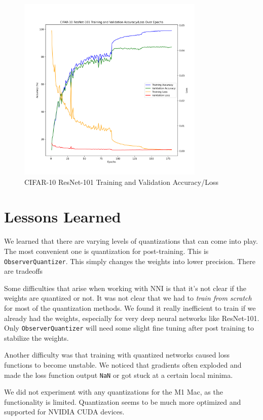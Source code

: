 \documentclass{article}
\begin{document}
\begin{figure}
    \centerline{\includegraphics[width=3.5in]{../proj2/figures/cifar10_baseline.png}}
    \caption{CIFAR-10 ResNet-101 Training and Validation Accuracy/Loss}
    \label{fig:cifar-resnet-nq}
\end{figure}

\section{Lessons Learned}
We learned that there are varying levels of quantizations that can come into play. The most convenient one is quantization for post-training. This is \verb|ObserverQuantizer|. This simply changes the weights into lower precision. There are tradeoffs


Some difficulties that arise when working with NNI is that it's not clear if the weights are quantized or not. It was not clear that we had to \textit{train from scratch} for most of the quantization methods. We found it really inefficient to train if we already had the weights, especially for very deep neural networks like ResNet-101. Only \verb|ObserverQuantizer| will need some slight fine tuning after post training to stabilize the weights. 

Another difficulty was that training with quantized networks caused loss functions to become unstable. We noticed that gradients often exploded and made the loss function output \verb|NaN| or got stuck at a certain local minima.

We did not experiment with any quantizations for the M1 Mac, as the functionality is limited. Quantization seems to be much more optimized and supported for NVIDIA CUDA devices. 
\end{document}
